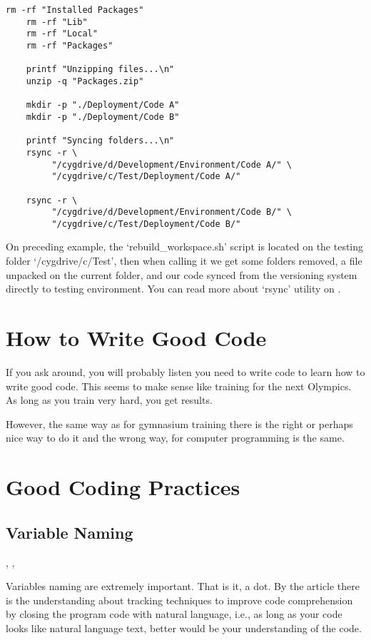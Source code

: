 \begin{englishtext}
\begin{lstlisting}[caption={rebuild\_workspace.sh}]
    rm -rf "Installed Packages"
    rm -rf "Lib"
    rm -rf "Local"
    rm -rf "Packages"

    printf "Unzipping files...\n"
    unzip -q "Packages.zip"

    mkdir -p "./Deployment/Code A"
    mkdir -p "./Deployment/Code B"

    printf "Syncing folders...\n"
    rsync -r \
         "/cygdrive/d/Development/Environment/Code A/" \
         "/cygdrive/c/Test/Deployment/Code A/"

    rsync -r \
         "/cygdrive/d/Development/Environment/Code B/" \
         "/cygdrive/c/Test/Deployment/Code B/"
    \end{lstlisting}
    \vspace*{-4mm}

    On preceding example, the `rebuild\_workspace.sh' script is located on the
    testing folder `/cygdrive/c/Test', then when calling it we get some folders
    removed, a file unpacked on the current folder, and our code synced from the
    versioning system directly to testing environment. You can read more about
    `rsync' utility on \citeonline{synchronizingFolders}.



    \section{How to Write Good Code}

    If you ask around, you will probably listen you need to write code to learn
    how to write good code. This seems to make sense like training for the next
    Olympics. As long as you train very hard, you get results.

    However, the same way as for gymnasium training there is the right or
    perhaps nice way to do it and the wrong way, for computer programming is the
    same.


    \section{Good Coding Practices}


    \subsection{Variable Naming}

    \cite{theImpactOfIdentifierStyle},
    \cite{womenAndMen},

    Variables naming are extremely important. That is it, a dot. By the article
    \citeonline{analysisOfCodeReading} there is the understanding about tracking
    techniques to improve code comprehension by closing the program code with
    natural language, i.e., as long as your code looks like natural language
    text, better would be your understanding of the code.


\end{englishtext}
